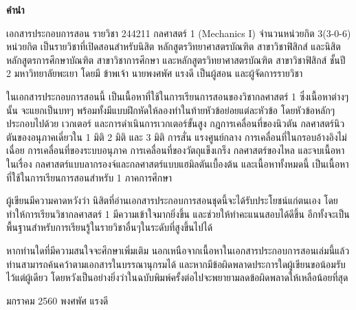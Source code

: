 

\begin{center}
\large{\textbf{คำนำ}}
\end{center}

เอกสารประกอบการสอน รายวิชา 244211 กลศาสตร์ 1 (Mechanics I) จำนวนหน่วยกิต 3(3-0-6) หน่วยกิต เป็นรายวิชาที่เปิดสอนสำหรับนิสิต หลักสูตรวิทยาศาสตรบัณฑิต สาขาวิชาฟิสิกส์ และนิสิตหลักสูตรการศึกษาบัณฑิต สาขาวิชาการศึกษา และหลักสูตรวิทยาศาสตรบัณฑิต สาขาวิชาฟิสิกส์ ชั้นปี 2 มหาวิทยาลัยพะเยา โดยมี ข้าพเจ้า นายพงศพัศ แรงดี เป็นผู้สอน และผู้จัดการรายวิชา

ในเอกสารประกอบการสอนนี้ เป็นเนื้อหาที่ใช้ในการเรียนการสอนของวิชากลศาสตร์ 1 ซึ่งเนื้อหาต่างๆนั้น จะแยกเป็นบทๆ พร้อมทั้งมีแบบฝึกหัดให้ลองทำในท้ายหัวข้อย่อยแต่ละหัวข้อ โดยหัวข้อหลักๆ ประกอบไปด้วย เวกเตอร์ และการดำเนินการเวกเตอร์ขั้นสูง กฎการเคลื่อนที่ของนิวตัน กลศาสตร์นิวตันของอนุภาคเดี่ยวใน 1 มิติ 2 มิติ และ 3 มิติ การสั่น แรงศูนย์กลาง การเคลื่อนที่ในกรอบอ้างอิงไม่เฉื่อย การเคลื่อนที่ของระบบอนุภาค การเคลื่อนที่ของวัตถุแข็งเกร็ง กลศาสตร์ของไหล และจบเนื้อหาในเรื่อง กลศาสตร์แบบลากรองจ์และกลศาสตร์แบบแฮมิลตันเบื้องต้น และเนื้อหาทั้งหมดนี้ เป็นเนื้อหาที่ใช้ในการเรียนการสอนสำหรับ 1 ภาคการศึกษา

ผู้เขียนมีความคาดหวังว่า นิสิตที่อ่านเอกสารประกอบการสอนชุดนี้จะได้รับประโยชน์แก่ตนเอง โดยทำให้การเรียนวิชากลศาสตร์ 1 มีความเข้าใจมากยิ่งขึ้น และช่วยให้ทำคะแนนสอบได้ดีขึ้น อีกทั้งจะเป็นพื้นฐานสำหรับการเรียนรู้ในรายวิชาอื่นๆในระดับที่สูงขึ้นไปได้

หากท่านใดที่มีความสนใจจะศึกษาเพิ่มเติม นอกเหนือจากเนื้อหาในเอกสารประกอบการสอนเล่มนี้แล้ว ท่านสามารถค้นคว้าตามเอกสารในบรรณานุกรมได้ และหากมีข้อผิดพลาดประการใดผู้เขียนขอน้อมรับไว้แต่ผู้เดียว โดยหวังเป็นอย่างยิ่งว่าในฉบับพิมพ์ครั้งต่อไปจะพยายามลดข้อผิดพลาดให้เหลือน้อยที่สุด

\vspace{1cm}
\begin{flushleft}\noindent
มกราคม 2560 \hfill  พงศพัศ แรงดี
\end{flushleft}










